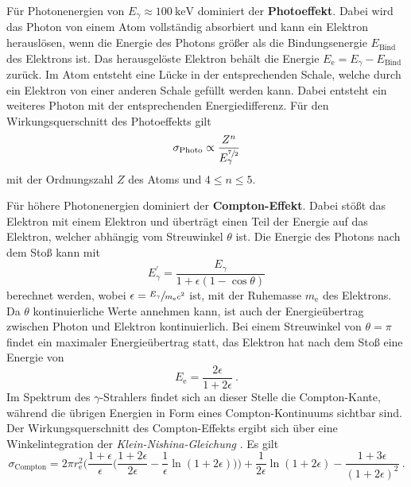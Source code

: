 Für Photonenergien von $E_{\gamma} \approx \SI{100}{\kilo\eV}$ dominiert der \textbf{Photoeffekt}.
Dabei wird das Photon von einem Atom vollständig absorbiert und kann ein Elektron herauslösen,
wenn die Energie des Photons größer als die Bindungsenergie $E_\text{Bind}$ des Elektrons ist.
Das herausgelöste Elektron behält die Energie $E_\text{e} = E_{\gamma} - E_\text{Bind}$ zurück.
Im Atom entsteht eine Lücke in der entsprechenden Schale,
welche durch ein Elektron von einer anderen Schale gefüllt werden kann.
Dabei entsteht ein weiteres Photon mit der entsprechenden Energiedifferenz.
Für den Wirkungsquerschnitt des Photoeffekts gilt
\begin{equation*}
    \sigma_\text{Photo} \propto \frac{Z^n}{E^{\sfrac{7}{2}}_{\gamma}}
\end{equation*}
mit der Ordnungszahl $Z$ des Atoms und $4 \leq n \leq \num{5}$.

Für höhere Photonenergien dominiert der \textbf{Compton-Effekt}.
Dabei stößt das Elektron mit einem Elektron und überträgt einen Teil der Energie auf das Elektron,
welcher abhängig vom Streuwinkel $\theta$ ist.
Die Energie des Photons nach dem Stoß kann mit
\begin{equation*}
    E^{'}_{\gamma} = \frac{E_{\gamma}}{1 + \epsilon(1 - \cos{\theta})}
\end{equation*}
berechnet werden,
wobei $\epsilon = \sfrac{E_{\gamma}}{m_\text{e} c^2}$ ist,
mit der Ruhemasse $m_\text{e}$ des Elektrons.
Da $\theta$ kontinuierliche Werte annehmen kann,
ist auch der Energieübertrag zwischen Photon und Elektron kontinuierlich.
Bei einem Streuwinkel von $\theta = \pi$ findet ein maximaler Energieübertrag statt,
das Elektron hat nach dem Stoß eine Energie von
\begin{equation*}
    E_\text{e} = \frac{2 \epsilon}{1 + 2 \epsilon} \ .
\end{equation*}
Im Spektrum des $\gamma$-Strahlers findet sich an dieser Stelle die Compton-Kante,
während die übrigen Energien in Form eines Compton-Kontinuums sichtbar sind.
Der Wirkungsquerschnitt des Compton-Effekts ergibt sich über eine Winkelintegration der \emph{Klein-Nishina-Gleichung} \cite{knoll}.
Es gilt
\begin{equation}
    \sigma_\text{Compton} =
    2 \pi r^2_\text{e} \biggl(\frac{1+\epsilon}{\epsilon} \biggl(\frac{1+2\epsilon}{2\epsilon} - \frac{1}{\epsilon}\ln(1+2\epsilon)\biggr)\biggr)
    + \frac{1}{2\epsilon} \ln(1+2\epsilon) - \frac{1+3\epsilon}{(1+2\epsilon)^2} \ .
\end{equation}

